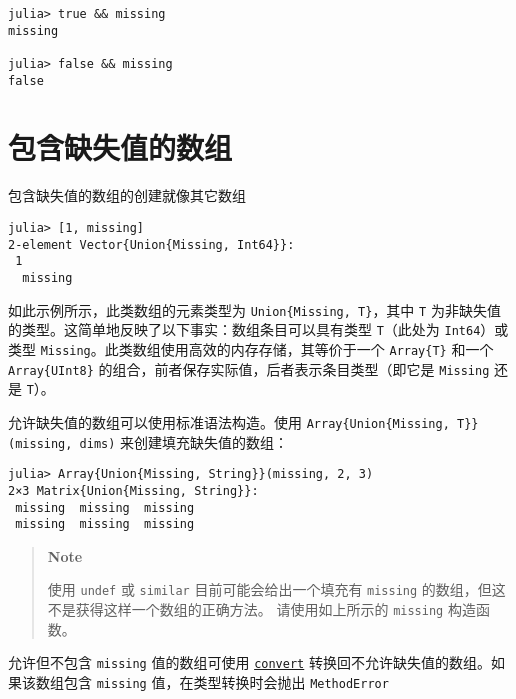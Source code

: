 \begin{verbatim}
julia> true && missing
missing

julia> false && missing
false
\end{verbatim}



\hypertarget{929400294062348079}{}


\section{包含缺失值的数组}



包含缺失值的数组的创建就像其它数组




\begin{verbatim}
julia> [1, missing]
2-element Vector{Union{Missing, Int64}}:
 1
  missing
\end{verbatim}



如此示例所示，此类数组的元素类型为 \texttt{Union\{Missing, T\}}，其中 \texttt{T} 为非缺失值的类型。这简单地反映了以下事实：数组条目可以具有类型 \texttt{T}（此处为 \texttt{Int64}）或类型 \texttt{Missing}。此类数组使用高效的内存存储，其等价于一个 \texttt{Array\{T\}} 和一个 \texttt{Array\{UInt8\}} 的组合，前者保存实际值，后者表示条目类型（即它是 \texttt{Missing} 还是 \texttt{T}）。



允许缺失值的数组可以使用标准语法构造。使用 \texttt{Array\{Union\{Missing, T\}\}(missing, dims)} 来创建填充缺失值的数组：




\begin{verbatim}
julia> Array{Union{Missing, String}}(missing, 2, 3)
2×3 Matrix{Union{Missing, String}}:
 missing  missing  missing
 missing  missing  missing
\end{verbatim}



\begin{quote}
\textbf{Note}

使用 \texttt{undef} 或 \texttt{similar} 目前可能会给出一个填充有 \texttt{missing} 的数组，但这不是获得这样一个数组的正确方法。 请使用如上所示的 \texttt{missing} 构造函数。

\end{quote}


允许但不包含 \texttt{missing} 值的数组可使用 \hyperlink{1846942650946171605}{\texttt{convert}} 转换回不允许缺失值的数组。如果该数组包含 \texttt{missing} 值，在类型转换时会抛出 \texttt{MethodError}





